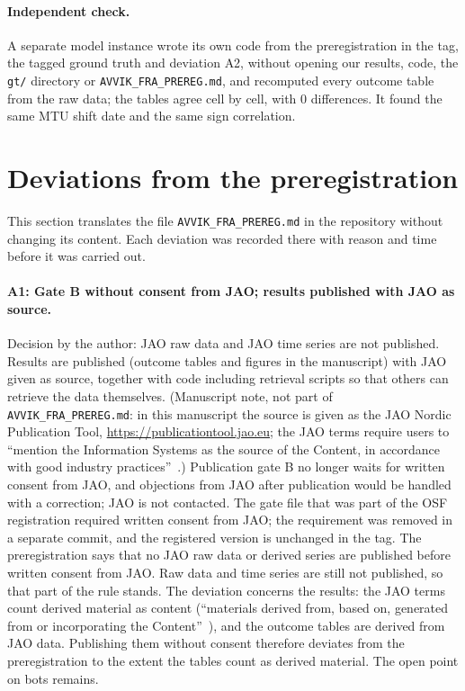 \paragraph{Independent check.}
A separate model instance wrote its own code from the preregistration in the tag, the tagged ground truth and deviation A2, without opening our results, code, the \texttt{gt/} directory or \texttt{AVVIK\_FRA\_PREREG.md}, and recomputed every outcome table from the raw data; the tables agree cell by cell, with 0 differences. %
It found the same MTU shift date and the same sign correlation. %

\section{Deviations from the preregistration}
\label{sec:avvik}

This section translates the file \texttt{AVVIK\_FRA\_PREREG.md} in the repository without changing its content.
Each deviation was recorded there with reason and time before it was carried out.

\paragraph{A1: Gate B without consent from JAO; results published with JAO as source.}
Decision by the author: JAO raw data and JAO time series are not published. %
Results are published (outcome tables and figures in the manuscript) with JAO given as source, together with code including retrieval scripts so that others can retrieve the data themselves. %
(Manuscript note, not part of \texttt{AVVIK\_FRA\_PREREG.md}: in this manuscript the source is given as the JAO Nordic Publication Tool, \url{https://publicationtool.jao.eu}; the JAO terms require users to ``mention the Information Systems as the source of the Content, in accordance with good industry practices''~\cite{jaoterms}.) %
Publication gate B no longer waits for written consent from JAO, and objections from JAO after publication would be handled with a correction; JAO is not contacted. %
The gate file that was part of the OSF registration required written consent from JAO; the requirement was removed in a separate commit, and the registered version is unchanged in the tag. %
The preregistration says that no JAO raw data or derived series are published before written consent from JAO. %
Raw data and time series are still not published, so that part of the rule stands. %
The deviation concerns the results: the JAO terms count derived material as content (``materials derived from, based on, generated from or incorporating the Content''~\cite{jaoterms}), and the outcome tables are derived from JAO data. %
Publishing them without consent therefore deviates from the preregistration to the extent the tables count as derived material. %
The open point on bots remains. %

